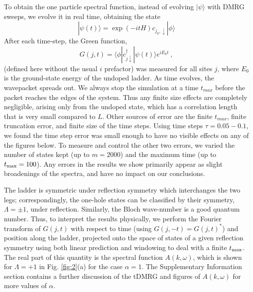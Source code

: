 \documentclass[aps,prb,twocolumn]{revtex4}
\def\be{\begin{equation}}       \def\ee{\end{equation}}
\begin{document}
To obtain the one particle spectral function, instead of evolving $|\psi\rangle$
with DMRG sweeps, we evolve it in real time, obtaining the state
\be
|\psi(t)\rangle = \exp(-i t H) c_{j_0,\downarrow} |\phi\rangle
\ee
After each time-step, the Green
 function,  
\be
G(j,t) = \langle \phi | c^\dagger_{j\downarrow} |\psi(t)\rangle e^{i E_0 t} \ ,
\ee
(defined here without the usual $i$ prefactor) was measured for all sites $j$,
where $E_0$ is the ground-state energy of the undoped ladder.  
As time evolves, the wavepacket spreads out.  We always stop the simulation at a time $t_{max}$ before
the packet reaches the edges of the system. Thus any finite size effects are completely
negligible, arising only from the undoped state, which has a 
correlation length that is very small compared to $L$.
Other sources of error are the finite $t_{max}$,
finite truncation error, and finite size of the time steps. Using time steps $\tau=0.05-0.1$, we found 
the time step error was small enough to have no visible effects on any of the figures below.
To measure and control the other two errors, we varied the number of states kept (up to
$m=2000$) and the maximum time (up to $t_{\rm max}=100$).  
Any errors in the results we show primarily appear as slight broadenings of
the spectra, and have no impact on our conclusions.

The ladder is symmetric under reflection symmetry which interchanges the two
legs;  correspondingly, the one-hole states can be classified by their
symmetry, $\Lambda=\pm1$, under reflection.  Similarly, the Bloch wave-number is
a good quantum number.  Thus, to interpret the results physically, we perform
the Fourier transform of $G(j,t)$ with respect to time (using $G(j,-t) = G(j,t)^*$) 
and position along the
ladder, projected onto the space of states of a given reflection symmetry using
both linear prediction\cite{WhiteAffleck} and windowing to deal with a finite
$t_{\rm max}$. The real part of this quantity is the  spectral
function $A(k,\omega)$,
which is shown for $\Lambda=+1$  
in Fig. \ref{fig:2}(a) for the case
$\alpha=1$.  The Supplementary Information
section contains a further discussion of the tDMRG and 
figures of $A(k,\omega)$ for more values of $\alpha$. 
\end{document}
